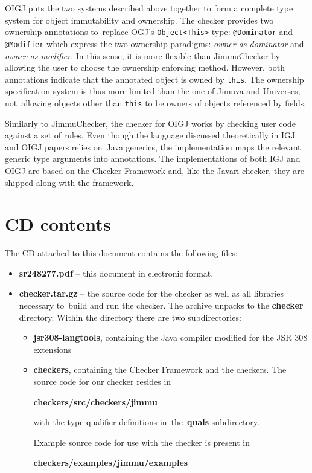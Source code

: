 \documentclass{pracamgr}
\theoremstyle{break}
\theoremstyle{break}
\theoremstyle{break}
\begin{document}
OIGJ puts the two systems described above together to form a complete
type system for object immutability and ownership. The checker
provides two ownership annotations to~replace OGJ's
\texttt{Object<This>} type: \texttt{@Dominator} and \texttt{@Modifier}
which express the two ownership paradigms: \emph{owner-as-dominator}
and \emph{owner-as-modifier}. In this sense, it is more flexible than
JimmuChecker by allowing the user to choose the ownership enforcing
method. However, both annotations indicate that the annotated object
is owned by \texttt{this}. The ownership specification system is thus
more limited than the one of Jimuva and Universes, not~allowing
objects other than \texttt{this} to be owners of objects referenced by
fields.

Similarly to JimmuChecker, the checker for OIGJ works by checking
user code against a set of rules. Even though the language discussed
theoretically in IGJ and OIGJ papers relies on~Java generics, the
implementation maps the relevant generic type arguments into
annotations. The implementations of both IGJ and OIGJ are based on the
Checker Framework and, like the Javari checker, they are shipped along
with the framework.

\appendix


\chapter{CD contents}
\label{chap:cd}

The CD attached to this document contains the following files: 
\begin{itemize}
\item \textbf{sr248277.pdf} -- this document in electronic format,
\item \textbf{checker.tar.gz} -- the source code for the checker as
  well as all libraries necessary to~build and run the checker. The
  archive unpacks to the \textbf{checker} directory. Within the
  directory there are two subdirectories:
  \begin{itemize}
  \item \textbf{jsr308-langtools}, containing the Java compiler
    modified for the JSR 308 extensions
  \item \textbf{checkers}, containing the Checker Framework and the
    checkers. The source code for our checker resides in
    \begin{center}
      \textbf{checkers/src/checkers/jimmu}
    \end{center}
    with the type qualifier definitions in~the~\textbf{quals}
    subdirectory.

    Example source code for use with the checker is present in
    \begin{center}
      \textbf{checkers/examples/jimmu/examples}
    \end{center}
  \end{itemize}
\end{itemize}
\end{document}
